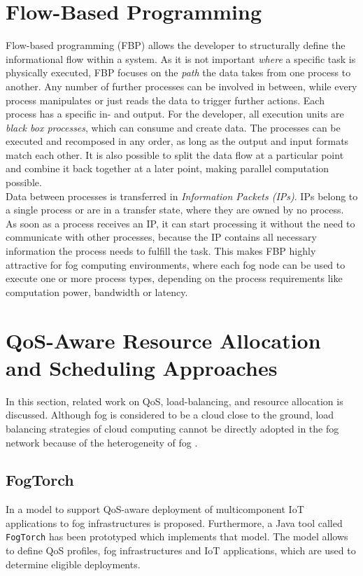 \section{Flow-Based Programming}
Flow-based programming (FBP) allows the developer to structurally define the informational flow within a system.
As it is not important \textit{where} a specific task is physically executed, FBP focuses on the \textit{path} the data takes from one process to another.
Any number of further processes can be involved in between, while every process manipulates or just reads the data to trigger further actions. Each process has a specific in- and output.
For the developer, all execution units are \textit{black box processes}, which can consume and create data.
The processes can be executed and recomposed in any order, as long as the output and input formats match each other.
It is also possible to split the data flow at a particular point and combine it back together at a later point, making parallel computation possible.\\

Data between processes is transferred in \textit{Information Packets (IPs)}.
IPs belong to a single process or are in a transfer state, where they are owned by no process.
As soon as a process receives an IP, it can start processing it without the need to communicate with other processes, because the IP contains all necessary information the process needs to fulfill the task.
This makes FBP highly attractive for fog computing environments, where each fog node can be used to execute one or more process types, depending on the process requirements like computation power, bandwidth or latency.

\section{QoS-Aware Resource Allocation and Scheduling Approaches}
In this section, related work on QoS, load-balancing, and resource allocation is discussed.
Although fog is considered to be a cloud close to the ground, load balancing strategies of cloud computing cannot be directly adopted in the fog network because of the heterogeneity of fog \cite{novel-load-balancing}.

\subsection*{FogTorch}
In \cite{fogtorch} a model to support QoS-aware deployment of multicomponent IoT applications to fog infrastructures is proposed. Furthermore, a Java tool called \texttt{FogTorch} has been prototyped which implements that model. The model allows to define QoS profiles, fog infrastructures and IoT applications, which are used to determine eligible deployments.\\

